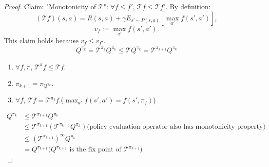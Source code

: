 \documentclass{report}
\begin{document}
\begin{proof}
    Claim: "Monotonicity of $\mathcal{T}$": $\forall f \leq f'$, $\mathcal{T}f \leq \mathcal{T}f'$. By definition: \[
        (\mathcal{T}f)(s,a)=R(s,a)+\gamma E_{s'\sim P(s,a)}[\max_{a'}f(s',a')],
    \] \[
        v_f:=\max_{a'}f(s',a').
    \]
    This claim holds because $v_f \leq v_{f'}$.\\ 
    \begin{equation*}
        \begin{split}
            Q^{\pi_k}=\mathcal{T}^{\pi_k}Q^{\pi_k}\leq \mathcal{T}Q^{\pi_k}=\mathcal{T}^{\pi_{k+1}}Q^{\pi_k}
        \end{split}
    \end{equation*}
    \begin{enumerate}
        \item $\forall f,\pi$, $\mathcal{T}^{\pi}f \leq \mathcal{T}f$.
        \item $\pi_{k+1}=\pi_{Q^{\pi_k}}$.
        \item $\forall f$, $\mathcal{T}f=\mathcal{T}^{\pi_f}f$.($\max_{a'}f(s',a')=f(s',\pi_f)$)
    \end{enumerate}
    \begin{equation*}
        \begin{split}
            Q^{\pi_k} &\leq \mathcal{T}^{\pi_{k+1}}Q^{\pi_k} \\
            & \leq \mathcal{T}^{\pi_{k+1}}(\mathcal{T}^{\pi_{k+1}}Q^{\pi_k}) \text{(policy evaluation operator also has monotonicity property)}\\
            & \leq (\mathcal{T}^{\pi_{k+1}})^{\infty}Q^{\pi_k} \\
            & = Q^{\pi_{k+1}} \text{($Q^{\pi_{k+1}}$ is the fix point of $\mathcal{T}^{\pi_{k+1}}$)}
        \end{split}
    \end{equation*}
\end{proof}
\end{document}
